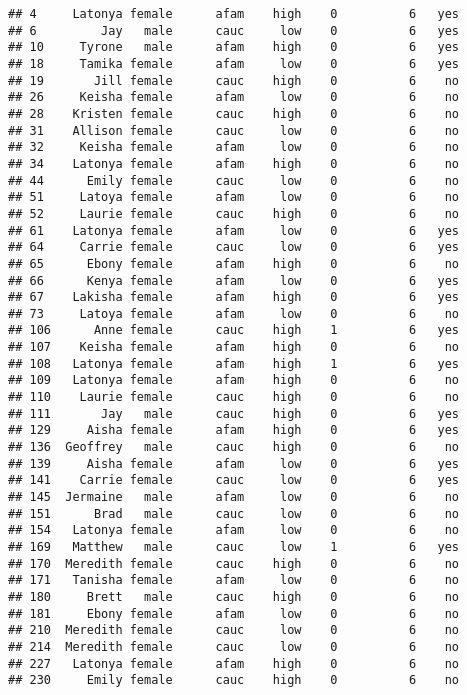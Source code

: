 \documentclass[
]{article}
\begin{document}
\begin{verbatim}
## 4     Latonya female      afam    high    0          6   yes
## 6         Jay   male      cauc     low    0          6   yes
## 10     Tyrone   male      afam    high    0          6   yes
## 18     Tamika female      afam     low    0          6   yes
## 19       Jill female      cauc    high    0          6    no
## 26     Keisha female      afam     low    0          6    no
## 28    Kristen female      cauc    high    0          6    no
## 31    Allison female      cauc     low    0          6    no
## 32     Keisha female      afam     low    0          6    no
## 34    Latonya female      afam    high    0          6    no
## 44      Emily female      cauc     low    0          6    no
## 51     Latoya female      afam     low    0          6    no
## 52     Laurie female      cauc    high    0          6    no
## 61    Latonya female      afam     low    0          6   yes
## 64     Carrie female      cauc     low    0          6   yes
## 65      Ebony female      afam    high    0          6    no
## 66      Kenya female      afam     low    0          6   yes
## 67    Lakisha female      afam    high    0          6   yes
## 73     Latoya female      afam     low    0          6    no
## 106      Anne female      cauc    high    1          6   yes
## 107    Keisha female      afam    high    0          6    no
## 108   Latonya female      afam    high    1          6   yes
## 109   Latonya female      afam    high    0          6    no
## 110    Laurie female      cauc    high    0          6    no
## 111       Jay   male      cauc    high    0          6   yes
## 129     Aisha female      afam    high    0          6   yes
## 136  Geoffrey   male      cauc    high    0          6    no
## 139     Aisha female      afam     low    0          6   yes
## 141    Carrie female      cauc     low    0          6   yes
## 145  Jermaine   male      afam     low    0          6    no
## 151      Brad   male      cauc     low    0          6    no
## 154   Latonya female      afam     low    0          6    no
## 169   Matthew   male      cauc     low    1          6   yes
## 170  Meredith female      cauc    high    0          6    no
## 171   Tanisha female      afam     low    0          6    no
## 180     Brett   male      cauc    high    0          6    no
## 181     Ebony female      afam     low    0          6    no
## 210  Meredith female      cauc     low    0          6    no
## 214  Meredith female      cauc     low    0          6    no
## 227   Latonya female      afam    high    0          6    no
## 230     Emily female      cauc    high    0          6    no

\end{verbatim}
\end{document}
